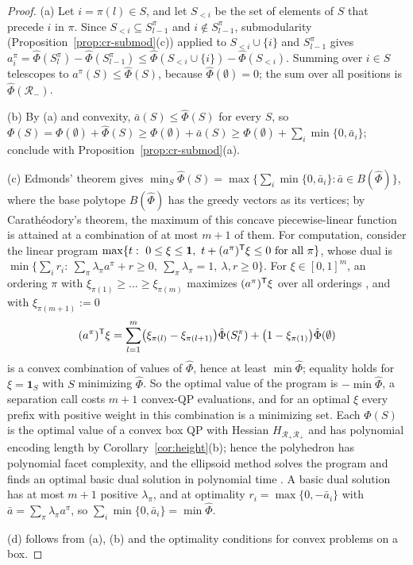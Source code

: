 \begin{proof}
(a) Let $i=\pi(l)\in S$, and let $S_{<i}$ be the set of elements of $S$
that precede $i$ in $\pi$. Since $S_{<i}\subseteq S^\pi_{l-1}$ and
$i\notin S^\pi_{l-1}$, submodularity (Proposition~\ref{prop:cr-submod}(c))
applied to $S_{<i}\cup\{i\}$ and $S^\pi_{l-1}$ gives
$a^\pi_i=\hat\Phi(S^\pi_l)-\hat\Phi(S^\pi_{l-1})
\le\hat\Phi(S_{<i}\cup\{i\})-\hat\Phi(S_{<i})$. Summing over $i\in S$
telescopes to $a^\pi(S)\le\hat\Phi(S)$, because $\hat\Phi(\emptyset)=0$;
the sum over all positions is $\hat\Phi(\mathcal R_-)$.

(b) By (a) and convexity, $\bar a(S)\le\hat\Phi(S)$ for every $S$, so
$\Phi(S)=\Phi(\emptyset)+\hat\Phi(S)\ge\Phi(\emptyset)+\bar a(S)
\ge\Phi(\emptyset)+\sum_i\min\{0,\bar a_i\}$; conclude with
Proposition~\ref{prop:cr-submod}(a).

(c) Edmonds' theorem gives
$\min_S\hat\Phi(S)=\max\{\sum_i\min\{0,\bar a_i\}:\bar a\in B(\hat\Phi)\}$,
where the base polytope $B(\hat\Phi)$ has the greedy vectors as its
vertices; by Carath\'eodory's theorem, the maximum of this concave
piecewise-linear function is attained at a combination of at most $m+1$ of
them. For
computation, consider the linear program
$\max\{t:\ 0\le\xi\le\mathbf 1,\ t+(a^\pi)^{\T}\xi\le0\ \text{for all }\pi\}$,
whose dual is $\min\{\sum_ir_i:\ \sum_\pi\lambda_\pi a^\pi+r\ge0,\
\sum_\pi\lambda_\pi=1,\ \lambda,r\ge0\}$. For $\xi\in[0,1]^m$, an ordering
$\pi$ with $\xi_{\pi(1)}\ge\dots\ge\xi_{\pi(m)}$ maximizes $(a^\pi)^{\mathsf T}\xi$
over all orderings \cite{Edmonds1970}, and with $\xi_{\pi(m+1)}:=0$
\[
(a^\pi)^{\mathsf T}\xi=\sum_{l=1}^m\bigl(\xi_{\pi(l)}-\xi_{\pi(l+1)}\bigr)
\hat\Phi(S^\pi_l)+\bigl(1-\xi_{\pi(1)}\bigr)\hat\Phi(\emptyset)
\]
is a convex combination of values of $\hat\Phi$, hence at least
$\min\hat\Phi$; equality holds for $\xi=\mathbf 1_S$ with $S$ minimizing
$\hat\Phi$. So the optimal value of the program is $-\min\hat\Phi$, a
separation call costs $m+1$ convex-QP evaluations, and for an optimal $\xi$
every prefix with positive weight in this combination is a minimizing set.
Each $\Phi(S)$ is the optimal value of a convex box QP with Hessian
$H_{\mathcal R_+\mathcal R_+}$ and has polynomial encoding length by
Corollary~\ref{cor:height}(b); hence the polyhedron has polynomial facet
complexity, and the ellipsoid method solves the program and finds an optimal
basic dual solution in polynomial time
\cite[Theorem~6.4.9, Lemma~6.5.15]{GrotschelLovaszSchrijver1988}. A basic
dual solution has at most $m+1$ positive $\lambda_\pi$, and at optimality
$r_i=\max\{0,-\bar a_i\}$ with $\bar a=\sum_\pi\lambda_\pi a^\pi$, so
$\sum_i\min\{0,\bar a_i\}=\min\hat\Phi$.

(d) follows from (a), (b) and the optimality conditions for convex problems
on a box.
\end{proof}

